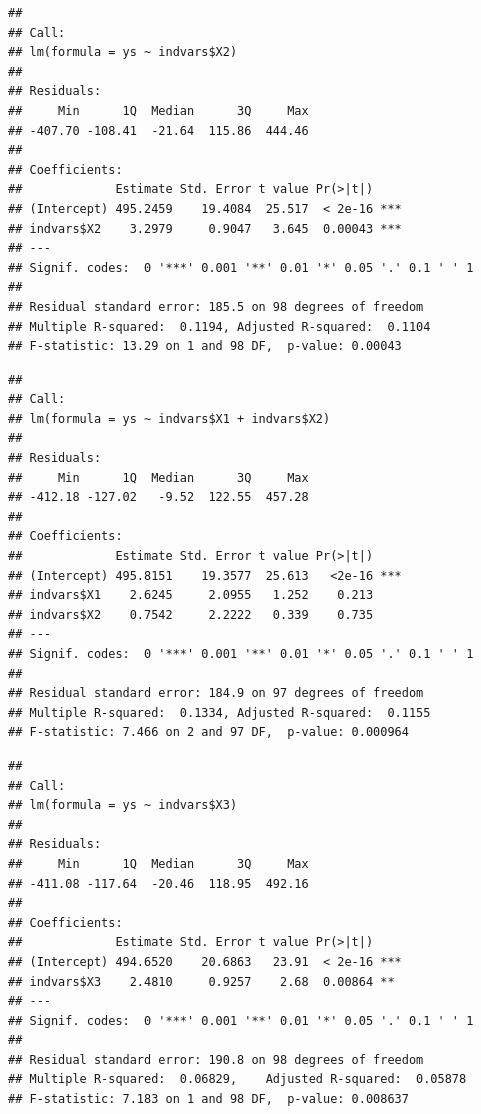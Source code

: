 \documentclass[
]{book}
\newenvironment{Shaded}{\begin{snugshade}}{\end{snugshade}}
\newcommand{\CommentTok}[1]{\textcolor[rgb]{0.56,0.35,0.01}{\textit{#1}}}
\newcommand{\KeywordTok}[1]{\textcolor[rgb]{0.13,0.29,0.53}{\textbf{#1}}}
\newcommand{\NormalTok}[1]{#1}
\newcommand{\OperatorTok}[1]{\textcolor[rgb]{0.81,0.36,0.00}{\textbf{#1}}}
\newcommand{\StringTok}[1]{\textcolor[rgb]{0.31,0.60,0.02}{#1}}
\begin{document}
\begin{verbatim}
## 
## Call:
## lm(formula = ys ~ indvars$X2)
## 
## Residuals:
##     Min      1Q  Median      3Q     Max 
## -407.70 -108.41  -21.64  115.86  444.46 
## 
## Coefficients:
##             Estimate Std. Error t value Pr(>|t|)    
## (Intercept) 495.2459    19.4084  25.517  < 2e-16 ***
## indvars$X2    3.2979     0.9047   3.645  0.00043 ***
## ---
## Signif. codes:  0 '***' 0.001 '**' 0.01 '*' 0.05 '.' 0.1 ' ' 1
## 
## Residual standard error: 185.5 on 98 degrees of freedom
## Multiple R-squared:  0.1194,	Adjusted R-squared:  0.1104 
## F-statistic: 13.29 on 1 and 98 DF,  p-value: 0.00043
\end{verbatim}

\begin{Shaded}
\end{Shaded}

\begin{verbatim}
## 
## Call:
## lm(formula = ys ~ indvars$X1 + indvars$X2)
## 
## Residuals:
##     Min      1Q  Median      3Q     Max 
## -412.18 -127.02   -9.52  122.55  457.28 
## 
## Coefficients:
##             Estimate Std. Error t value Pr(>|t|)    
## (Intercept) 495.8151    19.3577  25.613   <2e-16 ***
## indvars$X1    2.6245     2.0955   1.252    0.213    
## indvars$X2    0.7542     2.2222   0.339    0.735    
## ---
## Signif. codes:  0 '***' 0.001 '**' 0.01 '*' 0.05 '.' 0.1 ' ' 1
## 
## Residual standard error: 184.9 on 97 degrees of freedom
## Multiple R-squared:  0.1334,	Adjusted R-squared:  0.1155 
## F-statistic: 7.466 on 2 and 97 DF,  p-value: 0.000964
\end{verbatim}

\begin{Shaded}
\end{Shaded}

\begin{verbatim}
## 
## Call:
## lm(formula = ys ~ indvars$X3)
## 
## Residuals:
##     Min      1Q  Median      3Q     Max 
## -411.08 -117.64  -20.46  118.95  492.16 
## 
## Coefficients:
##             Estimate Std. Error t value Pr(>|t|)    
## (Intercept) 494.6520    20.6863   23.91  < 2e-16 ***
## indvars$X3    2.4810     0.9257    2.68  0.00864 ** 
## ---
## Signif. codes:  0 '***' 0.001 '**' 0.01 '*' 0.05 '.' 0.1 ' ' 1
## 
## Residual standard error: 190.8 on 98 degrees of freedom
## Multiple R-squared:  0.06829,	Adjusted R-squared:  0.05878 
## F-statistic: 7.183 on 1 and 98 DF,  p-value: 0.008637
\end{verbatim}
\end{document}
